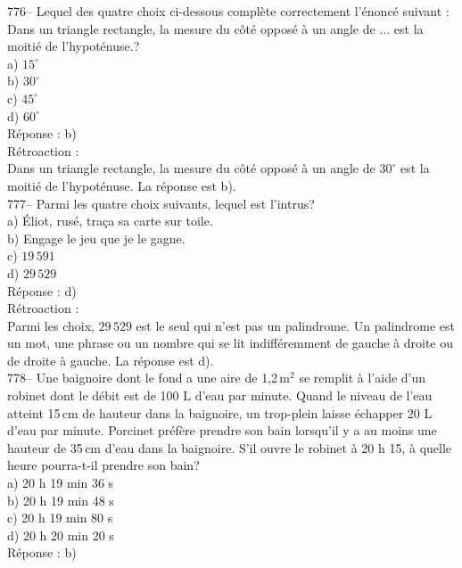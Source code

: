 ﻿\documentclass[letterpaper, 12pt]{article}
\begin{document}
776-- Lequel des quatre choix ci-dessous compl\`ete correctement
l'\'enonc\'e suivant : \og Dans un triangle rectangle, la mesure du
c\^ot\'e oppos\'e \`a un angle de $\ldots$ est la moiti\'e de l'hypot\'enuse.\fg ?\\
a) $15^{\circ}$\\
b) $30^{\circ}$\\
c) $45^{\circ}$\\
d) $60^{\circ}$\\

R\'eponse : b)\\

R\'etroaction : \\
Dans un triangle rectangle, la mesure du c\^ot\'e oppos\'e \`a un angle de
$30^{\circ}$ est la moiti\'e de l'hypot\'enuse.  La r\'eponse est b).\\


777-- Parmi les quatre choix suivants, lequel est l'intrus?\\
a) \'Eliot, rus\'e, tra\c ca sa carte sur toile.\\
b) Engage le jeu que je le gagne.\\
c) $19\,591$\\
d) $29\,529$\\

R\'eponse : d)\\

R\'etroaction : \\
Parmi les choix, $29\,529$ est le seul qui n'est pas un palindrome.  Un
palindrome est un mot, une phrase ou un nombre qui se lit indiff\'eremment
de gauche \`a droite ou de droite \`a gauche.  La r\'eponse est d).\\

778-- Une baignoire dont le fond a une aire de 1,2\,m$^{2}$ se remplit \`a
l'aide d'un robinet dont le d\'ebit est de 100 L d'eau par minute.  Quand le
niveau de l'eau atteint 15\,cm de hauteur dans la baignoire, un trop-plein
laisse \'echapper 20 L d'eau par minute.  Porcinet pr\'ef\`ere prendre son
bain lorsqu'il y a au moins une hauteur de 35\,cm d'eau dans la baignoire.
S'il ouvre le robinet \`a 20 h 15, \`a quelle heure pourra-t-il prendre son
bain?\\
a) 20 h 19 min 36 s\\
b) 20 h 19 min 48 s\\
c) 20 h 19 min 80 s\\
d) 20 h 20 min 20 s\\


R\'eponse : b)\\
\end{document}
